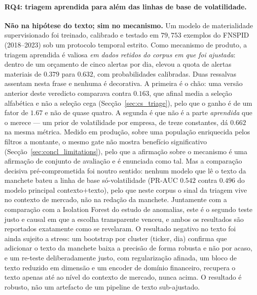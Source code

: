 \paragraph{RQ4: triagem aprendida para além das linhas de base de volatilidade.}
\textbf{Não na hipótese do texto; sim no mecanismo.} Um modelo de materialidade supervisionado foi
treinado, calibrado e testado em $79{,}753$ exemplos do FNSPID (2018--2023) sob um protocolo temporal
estrito. Como mecanismo de produto, a triagem aprendida é valiosa \emph{em dados retidos do corpus em
que foi ajustada}: dentro de um orçamento de cinco alertas por dia, elevou a quota de alertas materiais
de $0.379$ para $0.632$, com probabilidades calibradas. Duas ressalvas assentam nesta frase e nenhuma
é decorativa. A primeira é o chão: uma versão anterior deste veredicto comparava contra $0.163$, que
afinal media a seleção alfabética e não a seleção cega (Secção~\ref{sec:cs_triage}), pelo que o ganho
é de um fator de $1.67$ e não de quase quatro. A segunda é que não é a parte \emph{aprendida} que o
merece --- um prior de volatilidade por empresa, de treze constantes, dá $0.662$ na mesma métrica.
Medido em
produção, sobre uma população enriquecida pelos filtros a montante, o mesmo gate não mostra benefício
significativo (Secção~\ref{sec:concl_limitations}), pelo que a afirmação sobre o mecanismo é uma
afirmação de conjunto de avaliação e é enunciada como tal. Mas a comparação decisiva pré-comprometida
foi noutro sentido: nenhum
modelo que lê o texto da manchete bateu a linha de base só-volatilidade (PR-AUC $0.542$ contra $0.496$
do modelo principal contexto$+$texto), pelo que neste corpus o sinal da triagem vive no contexto de
mercado, não na redação da manchete. Juntamente com a comparação com a Isolation Forest do estudo de
anomalias, este é o segundo teste justo e causal em que a escolha transparente venceu, e ambos os
resultados são reportados exatamente como se revelaram. O resultado negativo no texto foi ainda
sujeito a stress: um bootstrap por cluster (ticker, dia) confirma que adicionar o texto da manchete
baixa a precisão de forma robusta e não por acaso, e um re-teste deliberadamente justo, com
regularização afinada, um bloco de texto reduzido em dimensão e um encoder de domínio financeiro,
recupera o texto apenas até ao nível do contexto de mercado, nunca acima. O resultado é robusto, não
um artefacto de um pipeline de texto sub-ajustado.

